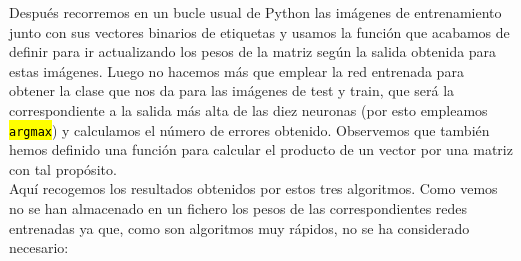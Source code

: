 \documentclass[10pt,a4paper]{article}
\newcommand{\code}[1]{\sethlcolor{light-gray}\hl{\texttt{#1}}} %
\begin{document}
Después recorremos en un bucle usual de Python las imágenes de entrenamiento junto con sus vectores binarios de etiquetas y usamos la función que acabamos de definir para ir actualizando los pesos de la matriz según la salida obtenida para estas imágenes. Luego no hacemos más que emplear la red entrenada para obtener la clase que nos da para las imágenes de test y train, que será la correspondiente a la salida más alta de las diez neuronas (por esto empleamos \code{argmax}) y calculamos el número de errores obtenido. Observemos que también hemos definido una función para calcular el producto de un vector por una matriz con tal propósito.\\

Aquí recogemos los resultados obtenidos por estos tres algoritmos. Como vemos no se han almacenado en un fichero los pesos de las correspondientes redes entrenadas ya que, como son algoritmos muy rápidos, no se ha considerado necesario:
\end{document}
